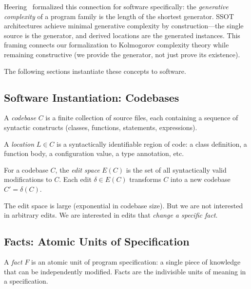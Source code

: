 Heering~\cite{heering2015generative} formalized this connection for software specifically: the \emph{generative complexity} of a program family is the length of the shortest generator. SSOT architectures achieve minimal generative complexity by construction---the single source is the generator, and derived locations are the generated instances. This framing connects our formalization to Kolmogorov complexity theory while remaining constructive (we provide the generator, not just prove its existence).

The following sections instantiate these concepts to software.


\subsection{Software Instantiation: Codebases}\label{sec:edit-space}

\begin{definition}[Codebase]
A \emph{codebase} $C$ is a finite collection of source files, each containing a sequence of syntactic constructs (classes, functions, statements, expressions).
\end{definition}

\begin{definition}[Location]
A \emph{location} $L \in C$ is a syntactically identifiable region of code: a class definition, a function body, a configuration value, a type annotation, etc.
\end{definition}

\begin{definition}
For a codebase $C$, the \emph{edit space} $E(C)$ is the set of all syntactically valid modifications to $C$. Each edit $\delta \in E(C)$ transforms $C$ into a new codebase $C' = \delta(C)$.
\end{definition}

The edit space is large (exponential in codebase size). But we are not interested in arbitrary edits. We are interested in edits that \emph{change a specific fact}.

\subsection{Facts: Atomic Units of Specification}\label{sec:facts}

\begin{definition}[Fact]\label{def:fact}
A \emph{fact} $F$ is an atomic unit of program specification: a single piece of knowledge that can be independently modified. Facts are the indivisible units of meaning in a specification.
\end{definition}


